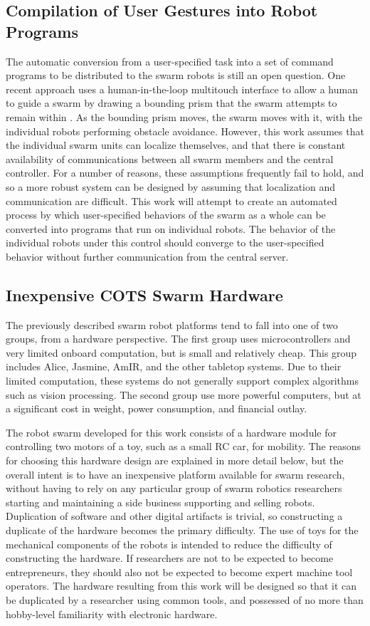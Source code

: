 \documentclass[]{article}
\begin{document}
\subsection{Compilation of User Gestures into Robot Programs}
The automatic conversion from a user-specified task into a set of command programs to be distributed to the swarm robots is still an open question.
One recent approach uses a human-in-the-loop multitouch interface to allow a human to guide a swarm by drawing a bounding prism that the swarm attempts to remain within \cite{ayanian2014controlling}. 
As the bounding prism moves, the swarm moves with it, with the individual robots performing obstacle avoidance. 
However, this work assumes that the individual swarm units can localize themselves, and that there is constant availability of communications between all swarm members and the central controller. 
For a number of reasons, these assumptions frequently fail to hold, and so a more robust system can be designed by assuming that localization and communication are difficult. 
This work will attempt to create an automated process by which user-specified behaviors of the swarm as a whole can be converted into programs that run on individual robots. 
The behavior of the individual robots under this control should converge to the user-specified behavior without further communication from the central server.

\subsection{Inexpensive COTS Swarm Hardware}

The previously described swarm robot platforms tend to fall into one of two groups, from a hardware perspective. 
The first group uses microcontrollers and very limited onboard computation, but is small and relatively cheap.
This group includes Alice, Jasmine, AmIR, and the other tabletop systems. 
Due to their limited computation, these systems do not generally support complex algorithms such as vision processing. 
The second group use more powerful computers, but at a significant cost in weight, power consumption, and financial outlay.

The robot swarm developed for this work consists of a hardware module for controlling two motors of a toy, such as a small RC car, for mobility. 
The reasons for choosing this hardware design are explained in more detail below, but the overall intent is to have an inexpensive platform available for swarm research, without having to rely on any particular group of swarm robotics researchers starting and maintaining a side business supporting and selling robots.
Duplication of software and other digital artifacts is trivial, so constructing a duplicate of the hardware becomes the primary difficulty. 
The use of toys for the mechanical components of the robots is intended to reduce the difficulty of constructing the hardware. 
If researchers are not to be expected to become entrepreneurs, they should also not be expected to become expert machine tool operators.
The hardware resulting from this work will be designed so that it can be duplicated by a researcher using common tools, and possessed of no more than hobby-level familiarity with electronic hardware.
\end{document}
